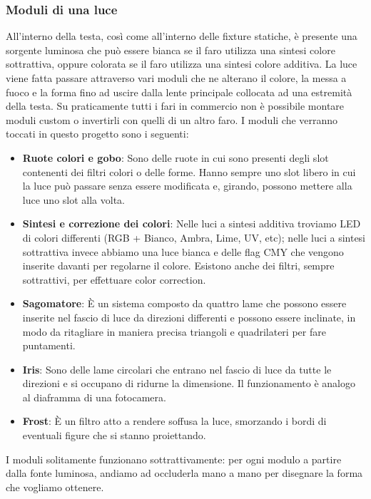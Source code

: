 \documentclass[main.tex]{subfiles}
\begin{document}
\subsubsection{Moduli di una luce}\label{subsec:1_1_modules}
All'interno della testa, così come all'interno delle fixture statiche, è presente una sorgente luminosa che può essere bianca se il faro utilizza una sintesi colore sottrattiva, oppure colorata se il faro utilizza una sintesi colore additiva. La luce viene fatta passare attraverso vari moduli che ne alterano il colore, la messa a fuoco e la forma fino ad uscire dalla lente principale collocata ad una estremità della testa. Su praticamente tutti i fari in commercio non è possibile montare moduli custom o invertirli con quelli di un altro faro. \newline
I moduli che verranno toccati in questo progetto sono i seguenti:
\begin{itemize}
    \item \textbf{Ruote colori e gobo}: Sono delle ruote in cui sono presenti degli slot contenenti dei filtri colori o delle forme. Hanno sempre uno slot libero in cui la luce può passare senza essere modificata e, girando, possono mettere  alla luce uno slot alla volta.
    \item \textbf{Sintesi e correzione dei colori}: Nelle luci a sintesi additiva troviamo LED di colori differenti (RGB + Bianco, Ambra, Lime, UV, etc); nelle luci a sintesi sottrattiva invece abbiamo una luce bianca e delle flag CMY che vengono inserite davanti per regolarne il colore. Esistono anche dei filtri, sempre sottrattivi, per effettuare color correction.
    \item \textbf{Sagomatore}: È un sistema composto da quattro lame che possono essere inserite nel fascio di luce da direzioni differenti e possono essere inclinate, in modo da ritagliare in maniera precisa triangoli e quadrilateri per fare puntamenti.
    \item \textbf{Iris}: Sono delle lame circolari che entrano nel fascio di luce da tutte le direzioni e si occupano di ridurne la dimensione. Il funzionamento è analogo al diaframma di una fotocamera.
    \item \textbf{Frost}: È un filtro atto a rendere soffusa la luce, smorzando i bordi di eventuali figure che si stanno proiettando.
\end{itemize}
I moduli solitamente funzionano sottrattivamente: per ogni modulo a partire dalla fonte luminosa, andiamo ad occluderla mano a mano per disegnare la forma che vogliamo ottenere.
\end{document}
